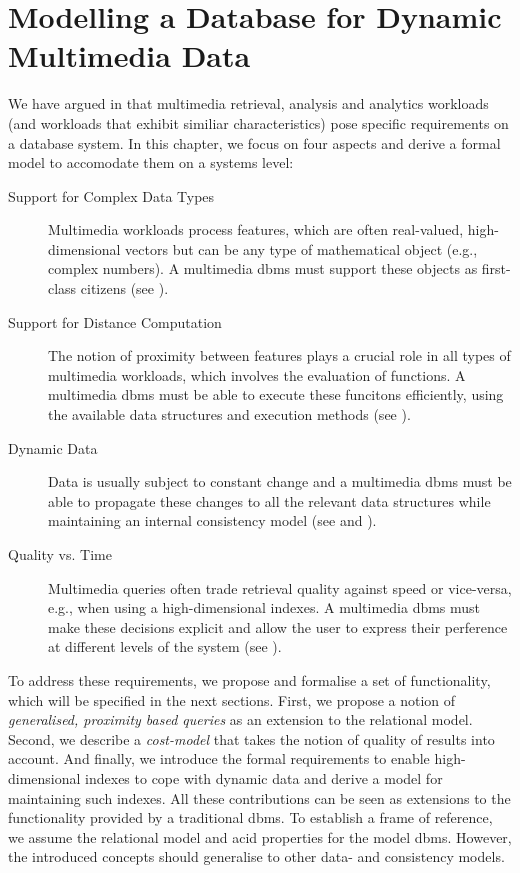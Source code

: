 \chapter{Modelling a Database for Dynamic Multimedia Data}
\label{chapter:system_model}

We have argued in  that multimedia retrieval, analysis and analytics workloads (and workloads that exhibit similiar characteristics) pose specific requirements on a database system. In this chapter, we focus on four aspects and derive a formal model to accomodate them on a systems level:

\begin{description}
    \item[Support for Complex Data Types] Multimedia workloads process features, which are often real-valued, high-dimensional vectors but can be any type of mathematical object (e.g., complex numbers). A multimedia \acrshort{dbms} must support these objects as first-class citizens (see ).
    \item[Support for Distance Computation] The notion of proximity between features plays a crucial role in all types of multimedia workloads, which involves the evaluation of functions. A multimedia \acrshort{dbms} must be able to execute these funcitons efficiently, using the available data structures and execution methods (see ).
    \item[Dynamic Data] Data is usually subject to constant change and a multimedia \acrshort{dbms} must be able to propagate these changes to all the relevant data structures while maintaining an internal consistency model (see  and ).
    \item[Quality vs. Time] Multimedia queries often trade retrieval quality against speed or vice-versa, e.g., when using a high-dimensional indexes. A multimedia \acrshort{dbms} must make these decisions explicit and allow the user to express their perference at different levels of the system (see ).
\end{description}

To address these requirements, we propose and formalise a set of functionality, which will be specified in the next sections. First, we propose a notion of \emph{generalised, proximity based queries} as an extension to the relational model. Second, we describe a \emph{cost-model} that takes the notion of quality of results into account. And finally, we introduce the formal requirements to enable high-dimensional indexes to cope with dynamic data and derive a model for maintaining such indexes. All these contributions can be seen as extensions to the functionality provided by a traditional \acrshort{dbms}. To establish a frame of reference, we assume the relational model and \acrshort{acid} properties for the model \acrshort{dbms}. However, the introduced concepts should generalise to other data- and consistency models.

